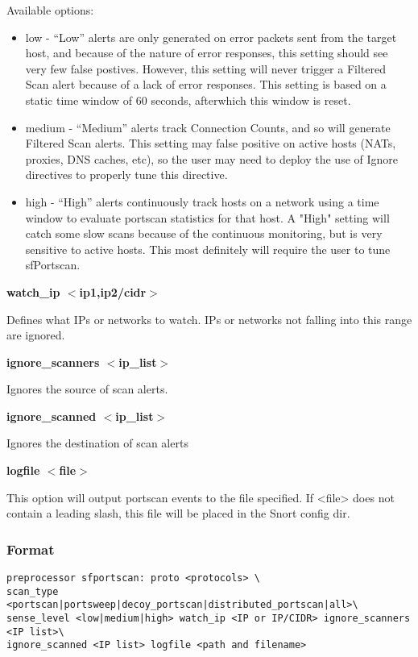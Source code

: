 \documentclass[english]{report}
\newcounter{slistnum}
\newenvironment{slist}
{ \begin{list}{ {\bf \arabic{slistnum}.} }{\usecounter{slistnum} } }
{ \end{list} }
\begin{document}
\begin{slist}
  Available options:
  \begin{itemize}
	\item low - ``Low'' alerts are only generated on error packets sent from the
  target host, and because of the nature of error responses, this
  setting should see very few false postives. However, this setting
  will never trigger a Filtered Scan alert because of a lack of error
  responses. This setting is based on a static time window of 60
  seconds, afterwhich this window is reset.
	\item medium - ``Medium'' alerts track Connection Counts, and so will generate
  Filtered Scan alerts. This setting may false positive on active
  hosts (NATs, proxies, DNS caches, etc), so the user may need to
  deploy the use of Ignore directives to properly tune this directive.
	\item high - ``High'' alerts continuously track hosts on a network using a time
  window to evaluate portscan statistics for that host. A "High"
  setting will catch some slow scans because of the continuous
  monitoring, but is very sensitive to active hosts. This most
  definitely will require the user to tune sfPortscan.
  \end{itemize}

\item \textbf{watch\_ip $<$ip1,ip2/cidr$>$ }

  Defines what IPs or networks to watch. IPs or networks not falling
  into this range are ignored.

\item \textbf{ignore\_scanners $<$ip\_list$>$ }

  Ignores the source of scan alerts.

\item \textbf{ignore\_scanned $<$ip\_list$>$ }

  Ignores the destination of scan alerts

\item \textbf{logfile $<$file$>$ } 

  This option will output portscan events to the file specified. If
  <file> does not contain a leading slash, this file will be placed in
  the Snort config dir.
\end{slist}

\subsubsection{Format}

\begin{verbatim}
preprocessor sfportscan: proto <protocols> \
scan_type <portscan|portsweep|decoy_portscan|distributed_portscan|all>\
sense_level <low|medium|high> watch_ip <IP or IP/CIDR> ignore_scanners <IP list>\
ignore_scanned <IP list> logfile <path and filename>
\end{verbatim}
\end{document}
